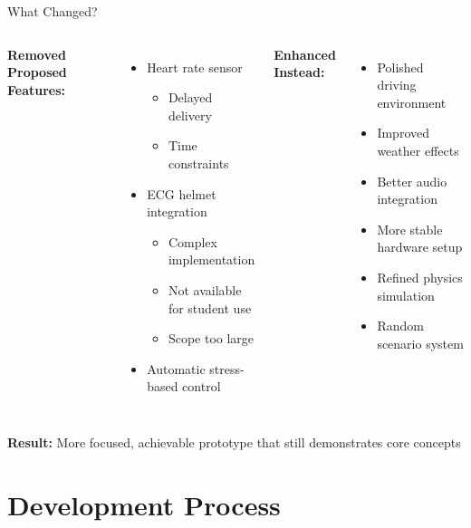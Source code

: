 \documentclass[aspectratio=169]{beamer}
\newenvironment{tlist}{\begin{itemize}}{\end{itemize}}
\begin{document}
\begin{frame}{What Changed?}
\begin{columns}[T]
\textbf{Removed Proposed Features:}
\begin{tlist}
    \item Heart rate sensor
    \begin{tlist}
        \item Delayed delivery
        \item Time constraints
    \end{tlist}
    \item ECG helmet integration
    \begin{tlist}
        \item Complex implementation
        \item Not available for student use
        \item Scope too large
    \end{tlist}
    \item Automatic stress-based control
\end{tlist}

\textbf{Enhanced Instead:}
\begin{tlist}
    \item Polished driving environment
    \item Improved weather effects
    \item Better audio integration
    \item More stable hardware setup
    \item Refined physics simulation
    \item Random scenario system
\end{tlist}
\end{columns}

\vspace{0.5cm}
\centering
\textbf{Result:} More focused, achievable prototype that still demonstrates core concepts
\end{frame}

\section{Development Process}
\end{document}
